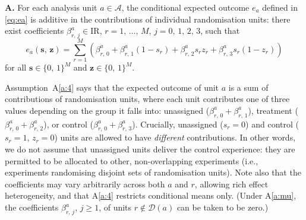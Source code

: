 \documentclass[sigconf]{acmart}
\newcounter{assumption}
\newenvironment{assumption}{\refstepcounter{assumption}\par\medskip\noindent\textbf{A\theassumption.}\enspace}{\par\medskip}
\newcommand{\R}{\mathrm{I}\!\mathrm{R}}
\begin{document}
\begin{assumption}\label{a:4}
For each analysis unit $a\in\mathcal{A}$, the conditional expected outcome $e_a$ defined in \eqref{eq:ea} is additive in the contributions of individual randomisation units: there exist coefficients $\beta^a_{r,\,j}\in\R$, $r=1,\,\ldots,\,M$, $j=0,\,1,\,2,\,3$, such that
\begin{equation*}
    e_a(\textbf{s},\,\textbf{z}) = \sum_{r=1}^M\left(\beta^a_{r,\,0}+\beta^a_{r,\,1}(1-s_r)+\beta^a_{r,\,2}s_rz_r+\beta^a_{r,\,3}s_r(1-z_r)\right)
\end{equation*}
for all $\textbf{s}\in\{0,\,1\}^M$ and $\textbf{z}\in\{0,\,1\}^M$.
\end{assumption}
Assumption~A\ref{a:4} says that the expected outcome of unit $a$ is a sum of contributions of randomisation units, where each unit contributes one of three values depending on the group it falls into: unassigned ($\beta^a_{r,\,0}+\beta^a_{r,\,1}$), treatment ($\beta^a_{r,\,0}+\beta^a_{r,\,2}$), or control ($\beta^a_{r,\,0}+\beta^a_{r,\,3}$). Crucially, unassigned ($s_r=0$) and control ($s_r=1$, $z_r=0$) units are allowed to have \emph{different} contributions. In other words, we do not assume that unassigned units deliver the control experience: they are permitted to be allocated to other, non-overlapping experiments (i.e., experiments randomising disjoint sets of randomisation units). Note also that the coefficients may vary arbitrarily across both $a$ and $r$, allowing rich effect heterogeneity, and that A\ref{a:4} restricts conditional means only. (Under A\ref{a:mu}, the coefficients $\beta^a_{r,\,j}$, $j\ge 1$, of units $r\notin\mathcal D(a)$ can be taken to be zero.)
\end{document}
